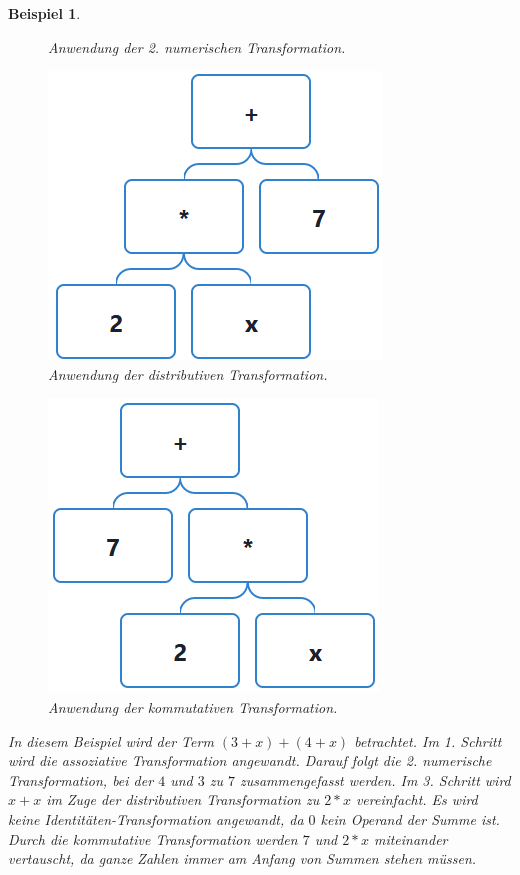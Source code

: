 \documentclass[11pt]{article}
\newtheorem{example}{Beispiel}
\begin{document}
\begin{example}
\begin{figure}[h]
\begin{minipage}{.5\textwidth}
      \caption{Anwendung der 2. numerischen Transformation.}
    \end{minipage}
    \begin{minipage}{.5\textwidth}
      \centering
      \includegraphics[scale=0.45]{trees/sum/beispiel_1_4.png}
      \caption{Anwendung der distributiven Transformation.}
    \end{minipage}
  \end{figure}
  \begin{figure}[h!]
    \centering
    \includegraphics*[scale=0.5]{trees/sum/beispiel_1_5.png}
    \caption{Anwendung der kommutativen Transformation.}
  \end{figure}
  In diesem Beispiel wird der Term $(3+x)+(4+x)$ betrachtet. Im 1. Schritt wird die assoziative Transformation angewandt.
  Darauf folgt die 2. numerische Transformation, bei der $4$ und $3$ zu $7$ zusammengefasst werden. 
  Im 3. Schritt wird $x+x$ im Zuge der distributiven Transformation zu $2*x$ vereinfacht.
  Es wird keine Identitäten-Transformation angewandt, da $0$ kein Operand der Summe ist.
  Durch die kommutative Transformation werden $7$ und $2*x$ miteinander vertauscht, da ganze Zahlen immer am 
  Anfang von Summen stehen müssen.
\end{example}
\end{document}
